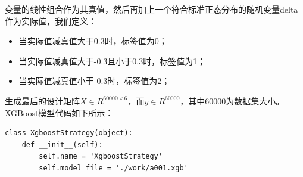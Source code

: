 \documentclass{article}
\begin{document}
变量的线性组合作为其真值，然后再加上一个符合标准正态分布的随机变量delta作为实际值，我们定义：
\begin{itemize}
    \item 当实际值减真值大于0.3时，标签值为0；
    \item 当实际值减真值大于-0.3且小于0.3时，标签值为1；
    \item 当实际值减真值小于-0.3时，标签值为2；
\end{itemize}
生成最后的设计矩阵$X \in R^{60000 \times 6}$，而$y \in R^{60000}$，其中60000为数据集大小。\newline
XGBoost模型代码如下所示：
\begin{lstlisting}
class XgboostStrategy(object):
    def __init__(self):
        self.name = 'XgboostStrategy'
        self.model_file = './work/a001.xgb'


\end{lstlisting}
\end{document}
